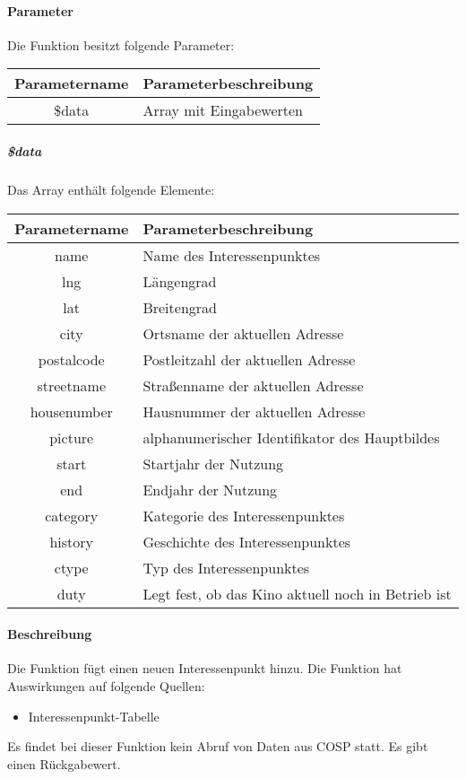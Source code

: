 \paragraph{Parameter} Die Funktion besitzt folgende Parameter:
\begin{table}[H]
	\begin{tabular}{|c|p{11cm}|}
		\hline
		\textbf{Parametername} & \textbf{Parameterbeschreibung} \\ \hline
		\$data & Array mit Eingabewerten \\ \hline
	\end{tabular}
\end{table}
\subparagraph{\$data}Das Array enthält folgende Elemente:
\begin{table}[H]
	\begin{tabular}{|c|p{11cm}|}
		\hline
		\textbf{Parametername} & \textbf{Parameterbeschreibung} \\ \hline
		name        & Name des Interessenpunktes \\ \hline
		lng         & Längengrad \\ \hline
		lat         & Breitengrad \\ \hline
		city        & Ortsname der aktuellen Adresse \\ \hline
		postalcode  & Postleitzahl der aktuellen Adresse \\ \hline
		streetname  & Straßenname der aktuellen Adresse \\ \hline
		housenumber & Hausnummer der aktuellen Adresse \\ \hline
		picture     & alphanumerischer Identifikator des Hauptbildes \\ \hline
		start       & Startjahr der Nutzung \\ \hline
		end         & Endjahr der Nutzung \\ \hline
		category    & Kategorie des Interessenpunktes \\ \hline
		history     & Geschichte des Interessenpunktes \\ \hline
		ctype       & Typ des Interessenpunktes \\ \hline
		duty        & Legt fest, ob das Kino aktuell noch in Betrieb ist \\ \hline
	\end{tabular}
\end{table}
\paragraph{Beschreibung} Die Funktion fügt einen neuen Interessenpunkt hinzu. Die Funktion hat Auswirkungen auf folgende Quellen:
\begin{itemize}
	\item Interessenpunkt-Tabelle
\end{itemize}
Es findet bei dieser Funktion kein Abruf von Daten aus {\glqq COSP\grqq} statt. Es gibt einen Rückgabewert.
